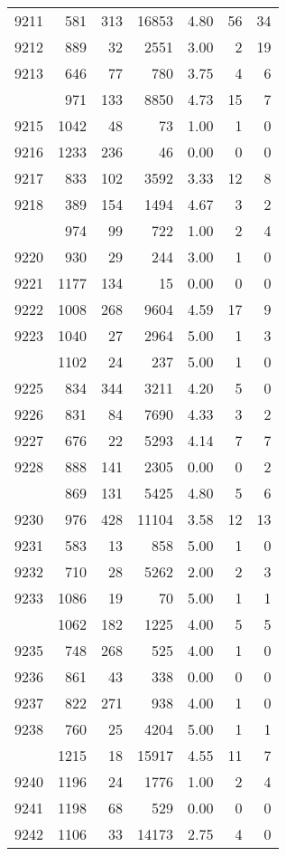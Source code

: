 \documentclass[
]{article}
\begin{document}
\begin{table}
\begin{tabular}[t]{lrrrrrr}
9211 & 581 & 313 & 16853 & 4.80 & 56 & 34\\
9212 & 889 & 32 & 2551 & 3.00 & 2 & 19\\
9213 & 646 & 77 & 780 & 3.75 & 4 & 6\\
\addlinespace
9214 & 971 & 133 & 8850 & 4.73 & 15 & 7\\
9215 & 1042 & 48 & 73 & 1.00 & 1 & 0\\
9216 & 1233 & 236 & 46 & 0.00 & 0 & 0\\
9217 & 833 & 102 & 3592 & 3.33 & 12 & 8\\
9218 & 389 & 154 & 1494 & 4.67 & 3 & 2\\
\addlinespace
9219 & 974 & 99 & 722 & 1.00 & 2 & 4\\
9220 & 930 & 29 & 244 & 3.00 & 1 & 0\\
9221 & 1177 & 134 & 15 & 0.00 & 0 & 0\\
9222 & 1008 & 268 & 9604 & 4.59 & 17 & 9\\
9223 & 1040 & 27 & 2964 & 5.00 & 1 & 3\\
\addlinespace
9224 & 1102 & 24 & 237 & 5.00 & 1 & 0\\
9225 & 834 & 344 & 3211 & 4.20 & 5 & 0\\
9226 & 831 & 84 & 7690 & 4.33 & 3 & 2\\
9227 & 676 & 22 & 5293 & 4.14 & 7 & 7\\
9228 & 888 & 141 & 2305 & 0.00 & 0 & 2\\
\addlinespace
9229 & 869 & 131 & 5425 & 4.80 & 5 & 6\\
9230 & 976 & 428 & 11104 & 3.58 & 12 & 13\\
9231 & 583 & 13 & 858 & 5.00 & 1 & 0\\
9232 & 710 & 28 & 5262 & 2.00 & 2 & 3\\
9233 & 1086 & 19 & 70 & 5.00 & 1 & 1\\
\addlinespace
9234 & 1062 & 182 & 1225 & 4.00 & 5 & 5\\
9235 & 748 & 268 & 525 & 4.00 & 1 & 0\\
9236 & 861 & 43 & 338 & 0.00 & 0 & 0\\
9237 & 822 & 271 & 938 & 4.00 & 1 & 0\\
9238 & 760 & 25 & 4204 & 5.00 & 1 & 1\\
\addlinespace
9239 & 1215 & 18 & 15917 & 4.55 & 11 & 7\\
9240 & 1196 & 24 & 1776 & 1.00 & 2 & 4\\
9241 & 1198 & 68 & 529 & 0.00 & 0 & 0\\
9242 & 1106 & 33 & 14173 & 2.75 & 4 & 0\\

\end{tabular}
\end{table}
\end{document}

